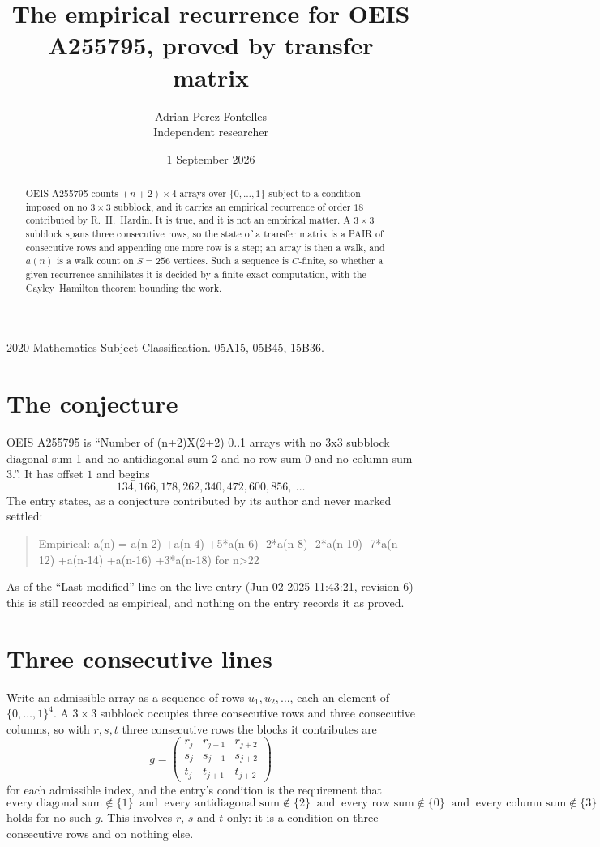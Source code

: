 \documentclass[11pt,a4paper]{article}
\title{The empirical recurrence for OEIS A255795, proved by transfer matrix}
\author{Adrian Perez Fontelles\\ \small Independent researcher}
\date{1 September 2026}
\theoremstyle{plain}
\theoremstyle{definition}
\begin{document}
\maketitle

\begin{abstract}
OEIS A255795 counts $(n+2)\times4$ arrays over $\{0,\dots,1\}$ subject to a condition imposed on
no $3\times3$ subblock, and it carries an empirical recurrence of order $18$
contributed by R.~H.~Hardin. It is true, and it is not an empirical matter. A $3\times3$
subblock spans three consecutive rows, so the state of a transfer matrix is a PAIR of
consecutive rows and appending one more row is a step; an array is then a walk, and
$a(n)$ is a walk count on $S=256$ vertices. Such a sequence is $C$-finite, so whether a given
recurrence annihilates it is decided by a finite exact computation, with the Cayley--Hamilton
theorem bounding the work.
\end{abstract}

\noindent\small 2020 Mathematics Subject Classification. 05A15, 05B45, 15B36.\normalsize

\section{The conjecture}

OEIS A255795 is ``Number of (n+2)X(2+2) 0..1 arrays with no 3x3 subblock diagonal sum 1 and no antidiagonal sum 2 and no row sum 0 and no column sum 3.''. It has offset $1$ and begins
\[
134, 166, 178, 262, 340, 472, 600, 856,\ \dots
\]
The entry states, as a conjecture contributed by its author and never marked settled:
\begin{quote}
Empirical: a(n) = a(n-2) +a(n-4) +5*a(n-6) -2*a(n-8) -2*a(n-10) -7*a(n-12) +a(n-14) +a(n-16) +3*a(n-18) for n>22
\end{quote}
As of the ``Last modified'' line on the live entry (Jun 02 2025 11:43:21, revision 6) this is still
recorded as empirical, and nothing on the entry records it as proved.

\section{Three consecutive lines}

Write an admissible array as a sequence of rows $u_1,u_2,\dots$, each an element of
$\{0,\dots,1\}^{4}$. A $3\times3$ subblock occupies three consecutive rows and
three consecutive columns, so with $r,s,t$ three consecutive rows the blocks it
contributes are
\[
g=\begin{pmatrix}r_j&r_{j+1}&r_{j+2}\\ s_j&s_{j+1}&s_{j+2}\\ t_j&t_{j+1}&t_{j+2}\end{pmatrix}
\]
for each admissible index, and the entry's condition is the requirement that
\[
\text{every diagonal sum} \notin \{1\}\ \text{ and }\ \text{every antidiagonal sum} \notin \{2\}\ \text{ and }\ \text{every row sum} \notin \{0\}\ \text{ and }\ \text{every column sum} \notin \{3\}
\]
holds for no such $g$. This involves $r$, $s$ and $t$ only: it is a condition on
three consecutive rows and on nothing else.
\end{document}
